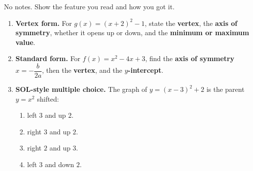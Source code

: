 \documentclass[10pt]{article}
\begin{document}

\vspace{0.12in}

No notes. Show the feature you read and how you got it.

\begin{enumerate}[leftmargin=1.8em, itemsep=12pt]
  \item \textbf{Vertex form.} For $g(x) = (x+2)^2 - 1$, state the \textbf{vertex}, the \textbf{axis of
        symmetry}, whether it opens up or down, and the \textbf{minimum or maximum value}.
  \item \textbf{Standard form.} For $f(x) = x^2 - 4x + 3$, find the \textbf{axis of symmetry}
        $x=-\dfrac{b}{2a}$, then the \textbf{vertex}, and the \textbf{$y$-intercept}.
  \item \textbf{SOL-style multiple choice.} The graph of $y = (x-3)^2 + 2$ is the parent $y=x^2$
        shifted:
        \begin{enumerate}[label=\Alph*., leftmargin=1.9em, itemsep=1pt]
          \item left $3$ and up $2$.
          \item right $3$ and up $2$.
          \item right $2$ and up $3$.
          \item left $3$ and down $2$.
        \end{enumerate}
\end{enumerate}
\end{document}
